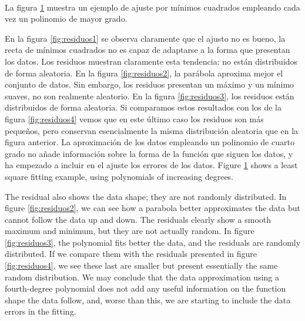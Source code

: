 \begin{figure}
	\centering
	 \qquad 
	\\
	 \qquad 
	\label{fig:residuos}
\end{figure}
\begin{paracol}{2}
La figura \ref{fig:residuos} muestra un ejemplo de ajuste por mínimos cuadrados empleando cada vez un polinomio de mayor grado.
    
En la figura \ref{fig:residuos1} se observa claramente que el ajusto no es bueno, la recta de mínimos cuadrados no es capaz de adaptarse a la forma que presentan los datos. Los residuos muestran claramente esta tendencia: no están distribuidos de forma aleatoria. En la figura \ref{fig:residuos2}, la parábola aproxima mejor el conjunto de datos. Sin embargo, los residuos presentan un máximo y un mínimo suaves, no son realmente aleatorio. En la figura \ref{fig:residuos3}, los residuos están distribuidos de forma aleatoria. Si comparamos estos resultados con los de la figura \ref{fig:residuos4} vemos que en este último caso los residuos son más pequeños, pero conservan esencialmente la misma distribución aleatoria que en la figura anterior. La aproximación de los datos empleando un polinomio de cuarto grado no añade información sobre la forma de la función que siguen los datos, y ha empezado a incluir en el ajuste los errores de los datos.
\switchcolumn
Figure \ref{fig:residuos} shows a least square fitting  example, using polynomials of increasing degrees.  

The residual also shows the data shape; they are not randomly distributed. In figure \ref{fig:residuos2}, we can see how a parabola better approximates the data but cannot follow the data up and down. The residuals clearly show a smooth maximum and minimum, but they are not actually random. In figure \ref{fig:residuos3}, the polynomial fits better the data, and the residuals are randomly distributed. If we compare them with the residuals presented in figure \ref{fig:residuos4}, we see these last are smaller but present essentially the same random distribution. We may conclude that the data approximation using a fourth-degree polynomial does not add any useful information on the function shape the data follow, and, worse than this, we are starting to include the data errors in the fitting.
\end{paracol}
